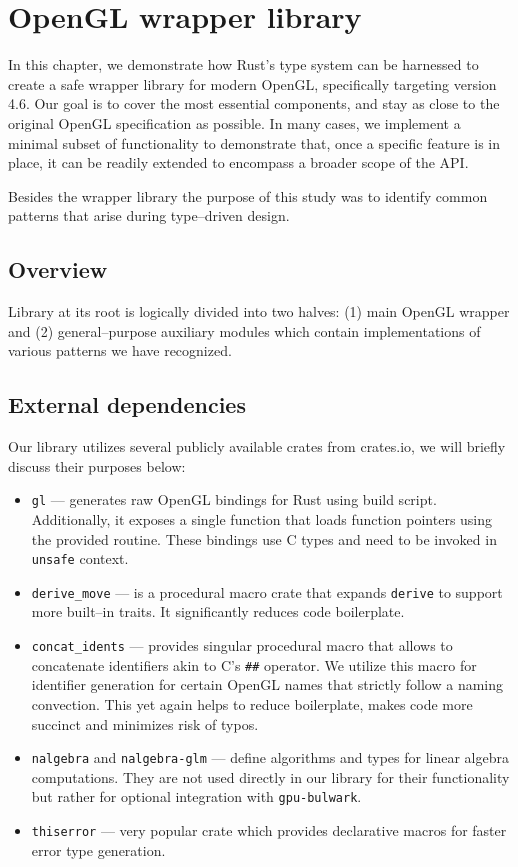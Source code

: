 \chapter{OpenGL wrapper library}

In this chapter, we demonstrate how Rust's type system can be harnessed to create a safe wrapper library for modern OpenGL, specifically targeting version 4.6. Our goal is to cover the most essential components, and stay as close to the original OpenGL specification as possible.
In many cases, we implement a minimal subset of functionality to demonstrate that, once a specific feature is in place, it can be readily extended to encompass a broader scope of the API.

Besides the wrapper library the purpose of this study was to identify common patterns that arise during type--driven design.

\section*{Overview}

Library at its root is logically divided into two halves: (1) main OpenGL wrapper and (2) general--purpose auxiliary modules which contain implementations of various patterns we have recognized.
%
\section{External dependencies}
%
Our library utilizes several publicly available crates from crates.io, we will briefly discuss their purposes below:
\begin{itemize}
    \item \texttt{gl} --- generates raw OpenGL bindings for Rust using build script. Additionally, it exposes a single function that loads function pointers using the provided routine. 
    These bindings use C types and need to be invoked in \texttt{unsafe} context.
    \item \texttt{derive\_move} --- is a procedural macro crate that expands \texttt{derive} to support more built--in traits. It significantly reduces code boilerplate.
    \item \texttt{concat\_idents} --- provides singular procedural macro that allows to concatenate identifiers akin to C's \texttt{\#\#} operator. We utilize this macro for identifier generation for certain OpenGL names that strictly follow a naming convection. This yet again helps to reduce boilerplate, makes code more succinct and minimizes risk of typos.
    \item \texttt{nalgebra} and \texttt{nalgebra-glm} --- define algorithms and types for linear algebra computations. They are not used directly in our library for their functionality but rather for optional integration with \texttt{gpu-bulwark}.
    \item \texttt{thiserror} --- very popular crate which provides declarative macros for faster error type generation.
\end{itemize}

